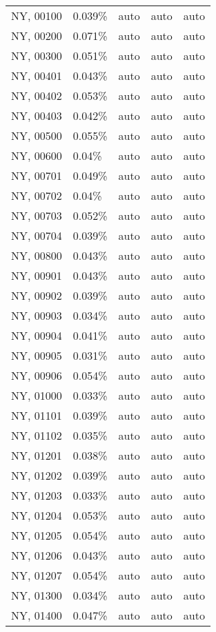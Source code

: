 \begin{longtable}[]{@{}lllll@{}}
NY, 00100 & 0.039\% & auto & auto & auto \\
NY, 00200 & 0.071\% & auto & auto & auto \\
NY, 00300 & 0.051\% & auto & auto & auto \\
NY, 00401 & 0.043\% & auto & auto & auto \\
NY, 00402 & 0.053\% & auto & auto & auto \\
NY, 00403 & 0.042\% & auto & auto & auto \\
NY, 00500 & 0.055\% & auto & auto & auto \\
NY, 00600 & 0.04\% & auto & auto & auto \\
NY, 00701 & 0.049\% & auto & auto & auto \\
NY, 00702 & 0.04\% & auto & auto & auto \\
NY, 00703 & 0.052\% & auto & auto & auto \\
NY, 00704 & 0.039\% & auto & auto & auto \\
NY, 00800 & 0.043\% & auto & auto & auto \\
NY, 00901 & 0.043\% & auto & auto & auto \\
NY, 00902 & 0.039\% & auto & auto & auto \\
NY, 00903 & 0.034\% & auto & auto & auto \\
NY, 00904 & 0.041\% & auto & auto & auto \\
NY, 00905 & 0.031\% & auto & auto & auto \\
NY, 00906 & 0.054\% & auto & auto & auto \\
NY, 01000 & 0.033\% & auto & auto & auto \\
NY, 01101 & 0.039\% & auto & auto & auto \\
NY, 01102 & 0.035\% & auto & auto & auto \\
NY, 01201 & 0.038\% & auto & auto & auto \\
NY, 01202 & 0.039\% & auto & auto & auto \\
NY, 01203 & 0.033\% & auto & auto & auto \\
NY, 01204 & 0.053\% & auto & auto & auto \\
NY, 01205 & 0.054\% & auto & auto & auto \\
NY, 01206 & 0.043\% & auto & auto & auto \\
NY, 01207 & 0.054\% & auto & auto & auto \\
NY, 01300 & 0.034\% & auto & auto & auto \\
NY, 01400 & 0.047\% & auto & auto & auto \\

\end{longtable}

